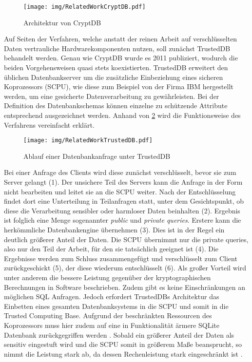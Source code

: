 \begin{figure}
	\texttt{[image: img/RelatedWorkCryptDB.pdf]}
	\centering
	\caption{Architektur von CryptDB}
	\label{fig:cryptdb}
\end{figure}

Auf Seiten der Verfahren, welche anstatt der reinen Arbeit auf verschlüsselten Daten vertrauliche Hardwarekomponenten nutzen, soll zunächst TrustedDB \cite{Bajaj2013} behandelt werden. Genau wie CryptDB wurde es 2011 publiziert, wodurch die beiden Vorgehensweisen quasi stets koexistierten. TrustedDB erweitert den üblichen Datenbankserver um die zusätzliche Einbeziehung eines sicheren Koprozessors (SCPU), wie diese zum Beispiel von der Firma IBM hergestellt werden, um eine gesicherte Datenverarbeitung zu gewährleisten. Bei der Definition des Datenbankschemas können einzelne zu schützende Attribute entsprechend ausgezeichnet werden. Anhand von \ref{fig:trusteddb} wird die Funktionsweise des Verfahrens vereinfacht erklärt. 

\begin{figure}[h]
	\texttt{[image: img/RelatedWorkTrustedDB.pdf]}
	\centering
	\caption{Ablauf einer Datenbankanfrage unter TrustedDB}
	\label{fig:trusteddb}
\end{figure}

Bei einer Anfrage des Clients wird diese zunächst verschlüsselt, bevor sie zum Server gelangt (1). Der unsichere Teil des Servers kann die Anfrage in der Form nicht bearbeiten und leitet sie an die SCPU weiter. Nach der Entschlüsselung findet dort eine Unterteilung in Teilanfragen statt, unter dem Gesichtspunkt, ob diese die Verarbeitung sensibler oder harmloser Daten beinhalten (2). Ergebnis ist folglich eine Menge sogenannter \textit{public} und \textit{private queries}. Erstere kann die herkömmliche Datenbankengine übernehmen (3). Dies ist in der Regel ein deutlich größerer Anteil der Daten. Die SCPU übernimmt nur die private queries, also nur den Teil der Arbeit, für den sie tatsächlich geeignet ist (4). Die Ergebnisse werden zum Schluss zusammengefügt und verschlüsselt zum Client zurückgeschickt (5), der diese wiederum entschlüsselt (6). Als großer Vorteil wird unter anderem die bessere Leistung gegenüber der kryptographischen Berechnungen in Software beschrieben. Zudem gibt es keine Einschränkungen an möglichen SQL Anfragen. Jedoch erfordert TrustedDBs Architektur das Einbetten eines gesamten Datenbanksystems in die SCPU und somit in die Trusted Computing Base. Aufgrund der beschränkten Ressourcen des Koprozessors muss hier zudem auf eine in Funktionalität ärmere SQLite Datenbank zurückgegriffen werden \cite{Arasu}. Sobald ein größerer Anteil der Daten als sensitiv eingestuft wird und die SCPU somit in größerem Maße beansprucht, so nimmt die Leistung stark ab, da dessen Rechenleistung stark eingeschränkt ist \cite{Arasu2012}.

